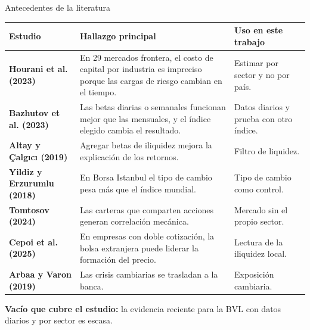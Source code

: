 \documentclass[aspectratio=169,10pt]{beamer}
\begin{document}
\begin{frame}{Antecedentes de la literatura}
\scriptsize
\renewcommand{\arraystretch}{1.22}
\begin{tabularx}{\textwidth}{@{}>{\raggedright\arraybackslash\bfseries\color{navy}}p{31mm} >{\raggedright\arraybackslash}X >{\raggedright\arraybackslash\color{gris}}p{38mm}@{}}
\toprule
\normalcolor\textbf{Estudio} & \textbf{Hallazgo principal} & \normalcolor\textbf{Uso en este trabajo} \\
\midrule
Hourani et al. (2023) & En 29 mercados frontera, el costo de capital por industria es impreciso porque las cargas de riesgo cambian en el tiempo. & Estimar por sector y no por país. \\
Bazhutov et al. (2023) & Las betas diarias o semanales funcionan mejor que las mensuales, y el índice elegido cambia el resultado. & Datos diarios y prueba con otro índice. \\
Altay y Çalgıcı (2019) & Agregar betas de iliquidez mejora la explicación de los retornos. & Filtro de liquidez. \\
Yildiz y Erzurumlu (2018) & En Borsa Istanbul el tipo de cambio pesa más que el índice mundial. & Tipo de cambio como control. \\
Tomtosov (2024) & Las carteras que comparten acciones generan correlación mecánica. & Mercado sin el propio sector. \\
Cepoi et al. (2025) & En empresas con doble cotización, la bolsa extranjera puede liderar la formación del precio. & Lectura de la iliquidez local. \\
Arbaa y Varon (2019) & Las crisis cambiarias se trasladan a la banca. & Exposición cambiaria. \\
\bottomrule
\end{tabularx}
\vfill
\begin{clave}
\textbf{Vacío que cubre el estudio:} la evidencia reciente para la BVL con datos diarios y por sector es escasa.
\end{clave}
\end{frame}
\end{document}

